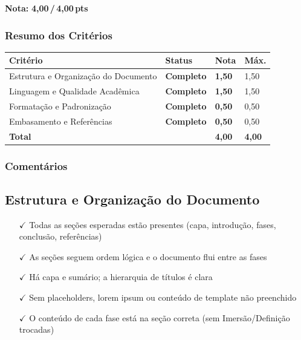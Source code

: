 \documentclass[
  sigconf,
  nonacm, %
  language=portuguese
]{acmart}
\newcommand{\notadestaque}[2]{%
  \noindent\textbf{Nota:}\enspace%
  {\large\bfseries\color{cred}#1\,/\,#2\,pts}%
}
\newcommand{\statusok}[1]{{\small\bfseries\color{cgood}#1}}
\begin{document}
\notadestaque{4,00}{4,00}

\subsubsection*{Resumo dos Critérios}

\begin{tabular}{@{} L{2.6cm} C{2.5cm} C{1.1cm} C{1.1cm} @{}}
\toprule
\textbf{Critério} & \textbf{Status} & \textbf{Nota} & \textbf{Máx.} \\
\midrule
Estrutura e Organização do Documento & \statusok{Completo} & \textbf{1,50} & 1,50 \\
Linguagem e Qualidade Acadêmica & \statusok{Completo} & \textbf{1,50} & 1,50 \\
Formatação e Padronização & \statusok{Completo} & \textbf{0,50} & 0,50 \\
Embasamento e Referências & \statusok{Completo} & \textbf{0,50} & 0,50 \\
\midrule
\textbf{Total} & & \textbf{\color{cred}4,00} & \textbf{4,00} \\
\bottomrule
\end{tabular}

\subsubsection*{Comentários}

\subsection{Estrutura e Organização do Documento}

\noindent\statusok{1,50\,/\,1,50 pts · Completo}

\begin{itemize}[leftmargin=14pt,itemsep=1pt,topsep=3pt,parsep=0pt]
  \item[\textcolor{cgood}{$\checkmark$}] {\small\textcolor{cgood}{Todas as seções esperadas estão presentes (capa, introdução, fases, conclusão, referências)}}
  \item[\textcolor{cgood}{$\checkmark$}] {\small\textcolor{cgood}{As seções seguem ordem lógica e o documento flui entre as fases}}
  \item[\textcolor{cgood}{$\checkmark$}] {\small\textcolor{cgood}{Há capa e sumário; a hierarquia de títulos é clara}}
  \item[\textcolor{cgood}{$\checkmark$}] {\small\textcolor{cgood}{Sem placeholders, lorem ipsum ou conteúdo de template não preenchido}}
  \item[\textcolor{cgood}{$\checkmark$}] {\small\textcolor{cgood}{O conteúdo de cada fase está na seção correta (sem Imersão/Definição trocadas)}}
\end{itemize}
\end{document}

